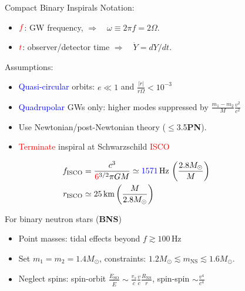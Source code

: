 \documentclass[xcolor=dvipsnames,t]{beamer}
\newcommand{\red}[1]{\textcolor{red}{#1}}
\newcommand{\bl}[1]{\textcolor{blue}{#1}}
\newcommand{\f}{\frac}
\begin{document}
\begin{frame}{Compact Binary Inspirals}
  \vspace{-4mm}
  Notation:
  \begin{itemize}
    \item $\red{f} $: GW frequency, \hspace{1.5cm} $\Longrightarrow\quad \omega\equiv2\pi f = 2\Omega$.
    \item $\red{t}$: observer/detector time \quad$ \Longrightarrow\quad\dot{Y}= dY/dt$.
  \end{itemize}
  {
    Assumptions:
    \begin{itemize}
      \item \bl{Quasi-circular} orbits: $e \ll 1$ and $\tfrac{|\dot{r}|}{r\Omega} <10^{-3} $ %
      \item \bl{Quadrupolar} GWs only: higher modes suppressed by $\tfrac{m_1-m_2}{M}\tfrac{v^2}{c^2}$
      \item Use Newtonian/post-Newtonian theory ($\le$3.5{\bf PN}).
      \vspace{0.5mm}
      \item \red{Terminate} inspiral at Schwarzschild \red{ISCO} 
      \begin{footnotesize}
      \begin{align*}
      f_\text{ISCO} &= \f{c^3}{\red{6}^{3/2}\pi G M} \simeq \bl{1571}\,\text{Hz}\, \left(\f{2.8M_\odot}{M}\right)\hspace{2cm}\\ 
      r_\text{ISCO} &\simeq 25\,\text{km}\left(\frac{M}{2.8 M_\odot}\right)
      \end{align*}
      \end{footnotesize}
    \end{itemize}
   } 
  {
    \vspace{1mm}
    For binary neutron stars ({\bf BNS})
    \begin{itemize}
      \item Point masses: tidal effects beyond $f \gtrsim 100\,$Hz
      \item Set $m_1 =m_2 = 1.4 M_\odot$, constraints: $1.2 M_\odot \lesssim m_\text{NS}\lesssim 1.6M_\odot$.
      \item Neglect spins: spin-orbit $\tfrac{\dot{E}_\text{SO}}{\dot{E}} \sim \tfrac{v_s}{c}\tfrac{v}{c}\tfrac{R_\text{NS}}{r}$, spin-spin $\sim \tfrac{v^4}{c^4}$
    \end{itemize}
}
\end{frame}
\end{document}
